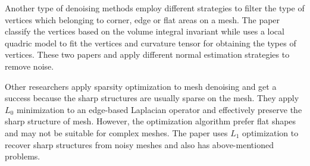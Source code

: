 Another type of denoising methods employ different strategies to filter the type of vertices which belonging to corner, edge or flat areas on a mesh.
The paper \cite{bian2011feature} classify the vertices based on the volume integral invariant
while \cite{fan2010robust} uses a local quadric model to fit the vertices and curvature tensor for obtaining the types of vertices.
These two papers \cite{wang2012cascaded} and \cite{wei2015bi} apply different normal estimation strategies to remove noise.

Other researchers \cite{he2013mesh} apply sparsity optimization to mesh denoising and get a success because the sharp structures are usually sparse on the mesh.
They apply $L_0$ minimization to an edge-based Laplacian operator and effectively preserve the sharp structure of mesh.
However, the optimization algorithm prefer flat shapes and may not be suitable for complex meshes.
The paper \cite{Wang2014decoupling} uses $L_1$ optimization to recover sharp structures from noisy meshes and also has above-mentioned problems.






